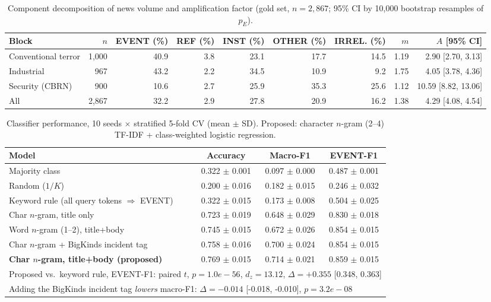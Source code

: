 \begin{table}[t]\centering\caption{Component decomposition of news volume and amplification factor (gold set, $n=2{,}867$; 95\% CI by 10{,}000 bootstrap resamples of $p_E$).}\label{tab:components}
\begin{tabular}{lrrrrrrrr}\toprule
Block & $n$ & EVENT (\%) & REF (\%) & INST (\%) & OTHER (\%) & IRREL. (\%) & $m$ & $A$ [95\% CI] \\\midrule
Conventional terror & 1,000 & 40.9 & 3.8 & 23.1 & 17.7 & 14.5 & 1.19 & 2.90 [2.70, 3.13] \\
Industrial & 967 & 43.2 & 2.2 & 34.5 & 10.9 & 9.2 & 1.75 & 4.05 [3.78, 4.36] \\
Security (CBRN) & 900 & 10.6 & 2.7 & 25.9 & 35.3 & 25.6 & 1.12 & 10.59 [8.82, 13.06] \\
All & 2,867 & 32.2 & 2.9 & 27.8 & 20.9 & 16.2 & 1.38 & 4.29 [4.08, 4.54] \\
\bottomrule\end{tabular}\end{table}

\begin{table}[t]\centering\caption{Classifier performance, 10 seeds $\times$ stratified 5-fold CV (mean $\pm$ SD). Proposed: character $n$-gram (2--4) TF-IDF + class-weighted logistic regression.}\label{tab:models}
\begin{tabular}{lccc}\toprule
Model & Accuracy & Macro-F1 & EVENT-F1 \\\midrule
Majority class & 0.322 $\pm$ 0.001 & 0.097 $\pm$ 0.000 & 0.487 $\pm$ 0.001 \\
Random ($1/K$) & 0.200 $\pm$ 0.016 & 0.182 $\pm$ 0.015 & 0.246 $\pm$ 0.032 \\
Keyword rule (all query tokens $\Rightarrow$ EVENT) & 0.322 $\pm$ 0.015 & 0.173 $\pm$ 0.008 & 0.504 $\pm$ 0.025 \\
Char $n$-gram, title only & 0.723 $\pm$ 0.019 & 0.648 $\pm$ 0.029 & 0.830 $\pm$ 0.018 \\
Word $n$-gram (1--2), title+body & 0.745 $\pm$ 0.015 & 0.672 $\pm$ 0.026 & 0.854 $\pm$ 0.015 \\
Char $n$-gram + BigKinds incident tag & 0.758 $\pm$ 0.016 & 0.700 $\pm$ 0.024 & 0.854 $\pm$ 0.015 \\
\textbf{Char $n$-gram, title+body (proposed)} & 0.769 $\pm$ 0.015 & 0.714 $\pm$ 0.021 & 0.859 $\pm$ 0.015 \\
\midrule\multicolumn{4}{l}{\footnotesize Proposed vs.\ keyword rule, EVENT-F1: paired $t$, $p=1.0e-56$, $d_z=13.12$, $\Delta=+0.355$ [0.348, 0.363]}\\
\multicolumn{4}{l}{\footnotesize Adding the BigKinds incident tag \emph{lowers} macro-F1: $\Delta=-0.014$ [-0.018, -0.010], $p=3.2e-08$}\\
\bottomrule\end{tabular}\end{table}

